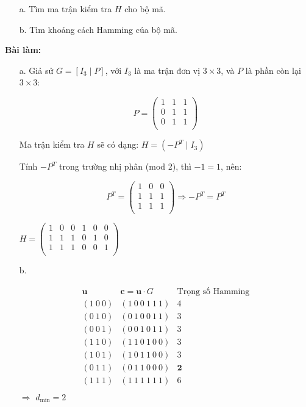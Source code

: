\documentclass[12pt]{article}
\begin{document}
\begin{itemize}
  \item[a.] Tìm ma trận kiểm tra $H$ cho bộ mã.
  \item[b.] Tìm khoảng cách Hamming của bộ mã.
\end{itemize}
\par\noindent\textbf{Bài làm:}
\begin{itemize}
    \item [a.] Giả sử $G = [I_3 \mid P]$, với $I_3$ là ma trận đơn vị $3 \times 3$, và $P$ là phần còn lại $3 \times 3$:

    \[
    P = \begin{pmatrix}
    1 & 1 & 1 \\
    0 & 1 & 1 \\
    0 & 1 & 1 \\
    \end{pmatrix}
    \]
    
    Ma trận kiểm tra $H$ sẽ có dạng:    $H = \left( -P^T \mid I_3 \right)$
    
    Tính $-P^T$ trong trường nhị phân (mod 2), thì $-1 = 1$, nên:
    
    \[
    P^T = \begin{pmatrix}
    1 & 0 & 0 \\
    1 & 1 & 1 \\
    1 & 1 & 1 \\
    \end{pmatrix}
    \Rightarrow -P^T = P^T
    \]
    
    $  H = \begin{pmatrix}
    1 & 0 & 0 & 1 & 0 & 0 \\
    1 & 1 & 1 & 0 & 1 & 0 \\
    1 & 1 & 1 & 0 & 0 & 1 \\
    \end{pmatrix}$
    
    \item [b.]

    \[
    \begin{array}{c|c|c}
    \mathbf{u} & \mathbf{c} = \mathbf{u} \cdot G & \text{Trọng số Hamming} \\
    \hline
    (1\ 0\ 0) & (1\ 0\ 0\ 1\ 1\ 1) & 4 \\
    (0\ 1\ 0) & (0\ 1\ 0\ 0\ 1\ 1) & 3 \\
    (0\ 0\ 1) & (0\ 0\ 1\ 0\ 1\ 1) & 3 \\
    (1\ 1\ 0) & (1\ 1\ 0\ 1\ 0\ 0) & 3 \\
    (1\ 0\ 1) & (1\ 0\ 1\ 1\ 0\ 0) & 3 \\
    (0\ 1\ 1) & (0\ 1\ 1\ 0\ 0\ 0) & \textbf{2} \\
    (1\ 1\ 1) & (1\ 1\ 1\ 1\ 1\ 1) & 6 \\
    \end{array}
    \]
    $\Rightarrow$  $d_\text{min} = 2$

\end{itemize}
\end{document}
